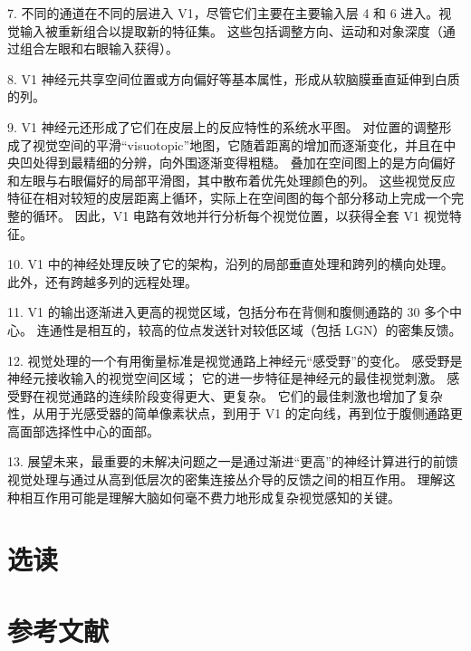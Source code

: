 7. 不同的通道在不同的层进入 V1，尽管它们主要在主要输入层 4 和 6 进入。视觉输入被重新组合以提取新的特征集。 
这些包括调整方向、运动和对象深度（通过组合左眼和右眼输入获得）。
 

8. V1 神经元共享空间位置或方向偏好等基本属性，形成从软脑膜垂直延伸到白质的列。
 


9. V1 神经元还形成了它们在皮层上的反应特性的系统水平图。 
对位置的调整形成了视觉空间的平滑“visuotopic”地图，它随着距离的增加而逐渐变化，并且在中央凹处得到最精细的分辨，向外围逐渐变得粗糙。 
叠加在空间图上的是方向偏好和左眼与右眼偏好的局部平滑图，其中散布着优先处理颜色的列。 
这些视觉反应特征在相对较短的皮层距离上循环，实际上在空间图的每个部分移动上完成一个完整的循环。 
因此，V1 电路有效地并行分析每个视觉位置，以获得全套 V1 视觉特征。 


10. V1 中的神经处理反映了它的架构，沿列的局部垂直处理和跨列的横向处理。 
此外，还有跨越多列的远程处理。 


11. V1 的输出逐渐进入更高的视觉区域，包括分布在背侧和腹侧通路的 30 多个中心。 
连通性是相互的，较高的位点发送针对较低区域（包括 LGN）的密集反馈。 


12. 视觉处理的一个有用衡量标准是视觉通路上神经元“感受野”的变化。 
感受野是神经元接收输入的视觉空间区域； 它的进一步特征是神经元的最佳视觉刺激。 
感受野在视觉通路的连续阶段变得更大、更复杂。 
它们的最佳刺激也增加了复杂性，从用于光感受器的简单像素状点，到用于 V1 的定向线，再到位于腹侧通路更高面部选择性中心的面部。 


13. 展望未来，最重要的未解决问题之一是通过渐进“更高”的神经计算进行的前馈视觉处理与通过从高到低层次的密集连接丛介导的反馈之间的相互作用。 
理解这种相互作用可能是理解大脑如何毫不费力地形成复杂视觉感知的关键。

\section{选读}
\section{参考文献}